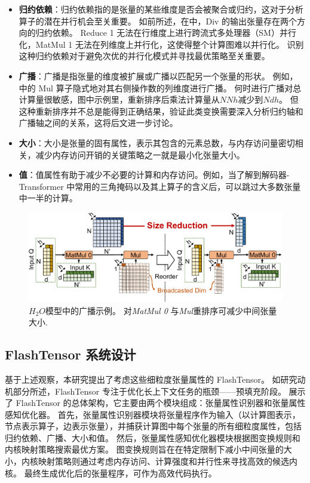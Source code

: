 \begin{itemize}

\item 
\textbf{归约依赖}：归约依赖指的是张量的某些维度是否会被聚合或归约，这对于分析算子的潜在并行机会至关重要。
如前所述，在中，Div 的输出张量存在两个方向的归约依赖。
Reduce 1 无法在行维度上进行跨流式多处理器（SM）并行化，MatMul 1 无法在列维度上并行化，这使得整个计算图难以并行化。
识别这种归约依赖对于避免次优的并行化模式并寻找最优策略至关重要。
\item
\textbf{广播}：广播是指张量的维度被扩展或广播以匹配另一个张量的形状。
例如，中的 Mul 算子隐式地对其右侧操作数的列维度进行广播。
何时进行广播对总计算量很敏感，图中示例里，重新排序后乘法计算量从\(NNh\)减少到\(Ndh\)。
但这种重新排序并不总是能得到正确结果，验证此类变换需要深入分析归约轴和广播轴之间的关系，这将后文进一步讨论。
\item
\textbf{大小}：大小是张量的固有属性，表示其包含的元素总数，与内存访问量密切相关，减少内存访问开销的关键策略之一就是最小化张量大小。
\item
\textbf{值}：值属性有助于减少不必要的计算和内存访问。例如，当了解到解码器-Transformer 中常用的三角掩码以及其上算子的含义后，可以跳过大多数张量中一半的计算。

\end{itemize}

\begin{figure}[htbp]
    \centering
    \includegraphics[width=0.7\linewidth]{figures/flashtensor/motivation_example_dependency_and_value.pdf}
    \caption{\(H_{2}O\)模型中的广播示例。 对\textit{MatMul 0} 与\textit{Mul}重排序可减少中间张量大小.}
    \label{fig:dependency_and_broadcast_example}
\end{figure}

\subsection{FlashTensor 系统设计}
基于上述观察，本研究提出了考虑这些细粒度张量属性的 FlashTensor。
如研究动机部分所述，FlashTensor 专注于优化长上下文任务的瓶颈——预填充阶段。
展示了 FlashTensor 的总体架构，它主要由两个模块组成：张量属性识别器和张量属性感知优化器。
首先，张量属性识别器模块将张量程序作为输入（以计算图表示，节点表示算子，边表示张量），并捕获计算图中每个张量的所有细粒度属性，包括归约依赖、广播、大小和值。
然后，张量属性感知优化器模块根据图变换规则和内核映射策略搜索最优方案。
图变换规则旨在在特定限制下减小中间张量的大小，内核映射策略则通过考虑内存访问、计算强度和并行性来寻找高效的候选内核。
最终生成优化后的张量程序，可作为高效代码执行。


